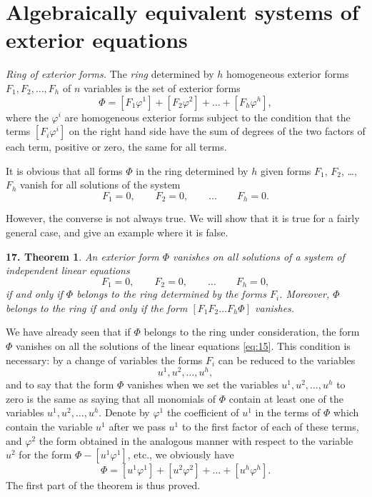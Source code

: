 \section{Algebraically equivalent systems of exterior equations}
\label{sec:algebr-equiv-syst}

\fsec \emph{Ring of exterior forms.} The \emph{ring} determined by $h$ homogeneous exterior forms $F_{1},F_{2},\dots,F_{h}$ of $n$ variables is the set of exterior forms
\[
\Phi=[F_{1}\varphi^{1}]+[F_{2}\varphi^{2}]+\dots+[F_{h}\varphi^{h}],
\]
where the $\varphi^{i}$ are homogeneous exterior forms subject to the  condition that  the terms $[F_{i}\varphi^{i}]$ on the right hand side have the sum of degrees of the two factors of each term, positive or zero, the same for all  terms.

It is obvious that all forms $\Phi$ in the ring determined by $h$ given forms $F_{1}$, $F_{2}$, \dots , $F_{h}$ vanish for all solutions of the system
\[
F_{1}=0,\qquad F_{2}=0,\qquad\dots\qquad F_{h}=0.
\]

However, the converse is not always true. We will show that it is true for a fairly general case, and give an example where it is false.

\vspace{12pt}\addtocounter{frenchsec}{1}
\theoremstyle{shape1}
\newtheorem*{thm17}{\hspace{15pt}\textbf{17.} Theorem}
\begin{thm17}
  An exterior form $\Phi$  vanishes on all solutions of a system of independent linear equations
  \begin{equation}
    \label{eq:15}
    F_{1}=0,\qquad F_{2}=0,\qquad\dots\qquad F_{h}=0,
  \end{equation}
if and only if $\Phi$ belongs to the ring determined by the forms $F_{i}$. Moreover,  $\Phi$  belongs to the ring if and only if the form $[F_{1}F_{2}\dots F_{h}\Phi]$ vanishes.
\end{thm17}

We have already seen that if $\Phi$ belongs to the ring under consideration, the form $\Phi$ vanishes on all the solutions of the linear equations \eqref{eq:15}. This condition is necessary: by a change of variables the forms $F_{i}$ can be reduced to the variables
\[
u^{1},u^{2},\dots,u^{h},
\]
and to say that the form $\Phi$ vanishes when we set the variables $u^{1},u^{2},\dots,u^{h}$ to zero is the same as saying that all monomials of $\Phi$ contain at least one of the variables $u^{1},u^{2},\dots,u^{h}$. Denote by $\varphi^{1}$ the coefficient of $u^{1}$ in the terms of $\Phi$ which contain the variable $u^{1}$ after we pass $u^{1}$ to the first factor of each of these terms, and $\varphi^{2}$ the form obtained in the analogous manner with respect to the variable $u^{2}$ for the form $\Phi-[u^{1}\varphi^{1}]$, {etc.},  we obviously have
\begin{equation}
  \label{eq:16}  
  \Phi=[u^{1}\varphi^{1}]+[u^{2}\varphi^{2}]+\dots+[u^{h}\varphi^{h}].
\end{equation}
The first part of the theorem is thus proved.

